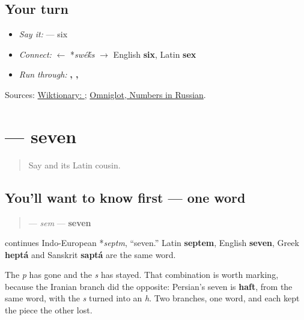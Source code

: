 \subsection*{Your turn}
\begin{itemize}
\raggedright
  \item \emph{Say it:} \textbf{} — six
  \item \emph{Connect:} \textbf{} $\leftarrow$ *\emph{swé\'{k}s} $\to$ English \textbf{six}, Latin \textbf{sex}
  \item \emph{Run through:} \textbf{, , }
\end{itemize}

\begin{tcolorbox}[breakable,colback=teal!4,colframe=teal!35!black,title={Before you move on}]
Sources: \href{https://en.wiktionary.org/wiki/\%D1\%88\%D0\%B5\%D1\%81\%D1\%82\%D1\%8C}{Wiktionary: }; \href{https://www.omniglot.com/language/numbers/russian.htm}{Omniglot, Numbers in Russian}.
\end{tcolorbox}
\section[\texorpdfstring{\ru{семь} (sem)}{семь (sem)}]{ — seven}

\label{lesson:RU-C24-sem}



\begin{quote}
Say \textbf{} and its Latin cousin.
\end{quote}

\subsection*{You'll want to know first — one word}
\begin{quote}
\textbf{} — \emph{sem} — \textbf{seven}
\end{quote}

\begin{cousinweb}
\textbf{} continues Indo-European *\emph{septm}, \textquotedblleft{}seven.\textquotedblright{} Latin \textbf{septem}, English \textbf{seven}, Greek \textbf{heptá} and Sanskrit \textbf{saptá} are the same word.

The \emph{p} has gone and the \emph{s} has stayed. That combination is worth marking, because the Iranian branch did the opposite: Persian's seven is \textbf{haft}, from the same word, with the \emph{s} turned into an \emph{h}. Two branches, one word, and each kept the piece the other lost.
\end{cousinweb}

